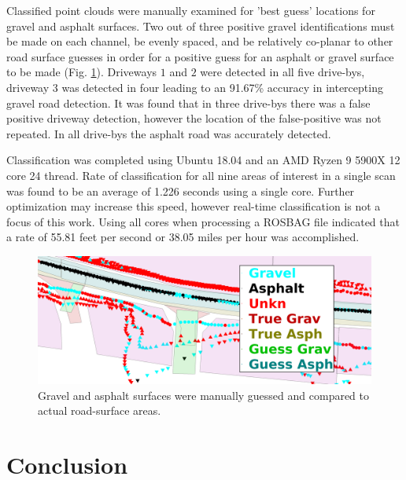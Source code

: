 \documentclass[balance,upint,subscriptcorrection,varvw,mathalfa=cal=boondoxo,colorlinks]{asmeconf}
\begin{document}
	{Classified point clouds were manually examined for 'best guess' locations for gravel and asphalt surfaces. Two out of three positive gravel identifications must be made on each channel, be evenly spaced, and be relatively co-planar to other road surface guesses in order for a positive guess for an asphalt or gravel surface to be made (Fig. \ref{fig:rm_db_4_toc}). Driveways $1$ and $2$ were detected in all five drive-bys, driveway $3$ was detected in four leading to an 91.67\% accuracy in intercepting gravel road detection. It was found that in three drive-bys there was a false positive driveway detection, however the location of the false-positive was not repeated. In all drive-bys the asphalt road was accurately detected. }
	
	{Classification was completed using Ubuntu 18.04 and an AMD Ryzen 9 5900X 12 core 24 thread. Rate of classification for all nine areas of interest in a single scan was found to be an average of 1.226 seconds using a single core. Further optimization may increase this speed, however real-time classification is not a focus of this work. Using all cores when processing a ROSBAG file indicated that a rate of 55.81 feet per second or 38.05 miles per hour was accomplished.}
	
	\begin{figure}
		\centering
		\includegraphics[width=0.9\linewidth]{figures/rm_db_4_ToC_2}
		\caption[Projected Guess vs Truth]{Gravel and asphalt surfaces were manually guessed and compared to actual road-surface areas. }
		\label{fig:rm_db_4_toc}
	\end{figure}
	
	
	
	


\section{Conclusion}
\end{document}
